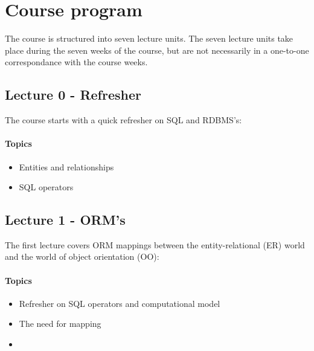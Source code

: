 \section{Course program}
	The course is structured into seven lecture units. The seven lecture units take place during the seven weeks of the course, but are not necessarily in a one-to-one correspondance with the course weeks.

	\subsection{Lecture 0 - Refresher}
		The course starts with a quick refresher on SQL and RDBMS's:

		\paragraph*{Topics}
			\begin{itemize}
				\item Entities and relationships
				\item SQL operators
			\end{itemize}


	\subsection{Lecture 1 - ORM's}
		The first lecture covers ORM mappings between the entity-relational (ER) world and the world of object orientation (OO):

		\paragraph*{Topics}
			\begin{itemize}
				\item Refresher on SQL operators and computational model
				\item The need for mapping
				\item 
			\end{itemize}

